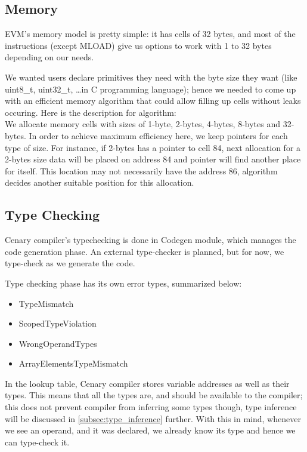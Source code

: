 \documentclass{article}
\begin{document}
\subsection{Memory}
\label{subsec:memory}
\par EVM's memory model is pretty simple: it has cells of 32 bytes, and most of the instructions (except MLOAD) give us options to work with 1 to 32 bytes depending on our needs.
\par We wanted users declare primitives they need with the byte size they want (like uint8\_t, uint32\_t, \ldots in C programming language); hence we needed to come up with an efficient memory algorithm that could allow filling up cells without leaks occuring. Here is the description for algorithm: \\

We allocate memory cells with sizes of 1-byte, 2-bytes, 4-bytes, 8-bytes and 32-bytes. In order to achieve maximum efficiency here, we keep pointers for each type of size. For instance, if 2-bytes has a pointer to cell 84, next allocation for a 2-bytes size data will be placed on address 84 and pointer will find another place for itself. This location may not necessarily have the address 86, algorithm decides another suitable position for this allocation.

\subsection{Type Checking}
\label{subsec:type_checking}
Cenary compiler's typechecking is done in Codegen module, which manages the code generation phase. An external type-checker is planned, but for now, we type-check as we generate the code.

Type checking phase has its own error types, summarized below:
\begin{itemize}
  \item TypeMismatch
  \item ScopedTypeViolation
  \item WrongOperandTypes
  \item ArrayElementsTypeMismatch
\end{itemize}

In the lookup table, Cenary compiler stores variable addresses as well as their types. This means that all the types are, and should be available to the compiler; this does not prevent compiler from inferring some types though, type inference will be discussed in \ref{subsec:type_inference} further. With this in mind, whenever we see an operand, and it was declared, we already know its type and hence we can type-check it.
\end{document}
